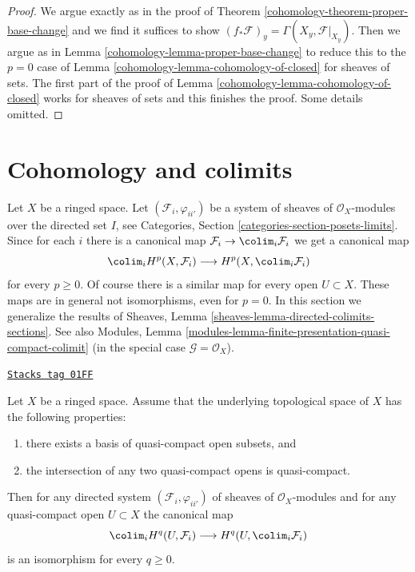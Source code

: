 \begin{proof}

We argue exactly as in the proof of Theorem \ref{cohomology-theorem-proper-base-change}
and we find it suffices to show
$(f_*\mathcal{F})_y = \Gamma(X_y, \mathcal{F}|_{X_y})$.
Then we argue as in Lemma \ref{cohomology-lemma-proper-base-change}
to reduce this to the $p = 0$ case of Lemma \ref{cohomology-lemma-cohomology-of-closed}
for sheaves of sets. The first part of the proof of
Lemma \ref{cohomology-lemma-cohomology-of-closed}
works for sheaves of sets and this finishes the proof.
Some details omitted.
\end{proof}

\section{Cohomology and colimits}
\label{cohomology-section-limits}
Let $X$ be a ringed space. Let $(\mathcal{F}_i, \varphi_{ii'})$ be
a system of sheaves of $\mathcal{O}_X$-modules over the directed set $I$, see
Categories, Section \ref{categories-section-posets-limits}.
Since for each $i$ there is a canonical map
$\mathcal{F}_i \to \colim_i \mathcal{F}_i$ we get a
canonical map
$$
\colim_i H^p(X, \mathcal{F}_i)
\longrightarrow
H^p(X, \colim_i \mathcal{F}_i)
$$
for every $p \geq 0$. Of course there is a similar map for
every open $U \subset X$. These maps are in general not isomorphisms,
even for $p = 0$. In this section we generalize the results of
Sheaves, Lemma \ref{sheaves-lemma-directed-colimits-sections}.
See also
Modules, Lemma \ref{modules-lemma-finite-presentation-quasi-compact-colimit}
(in the special case $\mathcal{G} = \mathcal{O}_X$).

\begin{lemma}
\label{cohomology-lemma-quasi-separated-cohomology-colimit}
\href{https://stacks.math.columbia.edu/tag/01FF}{\texttt{Stacks tag 01FF}}

Let $X$ be a ringed space. Assume that the underlying topological space
of $X$ has the following properties:
\begin{enumerate}
\item there exists a basis of quasi-compact open subsets, and
\item the intersection of any two quasi-compact opens is quasi-compact.
\end{enumerate}
Then for any directed system $(\mathcal{F}_i, \varphi_{ii'})$
of sheaves of $\mathcal{O}_X$-modules and for any quasi-compact open
$U \subset X$ the canonical map
$$
\colim_i H^q(U, \mathcal{F}_i)
\longrightarrow
H^q(U, \colim_i \mathcal{F}_i)
$$
is an isomorphism for every $q \geq 0$.
\end{lemma}

